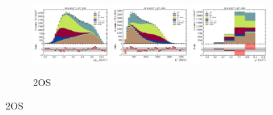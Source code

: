 \begin{figure}[htb]
    \begin{subfigure}{\textwidth}
        \includegraphics[width=0.32\textwidth]{./figs-supplemental-plots/init-fit/pre-ctrl/fit_result-stacked-D0-2os-mmiss2.pdf}
        \includegraphics[width=0.32\textwidth]{./figs-supplemental-plots/init-fit/pre-ctrl/fit_result-stacked-D0-2os-el.pdf}
        \includegraphics[width=0.32\textwidth]{./figs-supplemental-plots/init-fit/pre-ctrl/fit_result-stacked-D0-2os-q2.pdf}
        \caption{2OS}
    \end{subfigure}


\end{figure}
